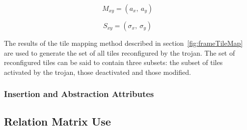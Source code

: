 \noindent\begin{minipage}{.5\linewidth}
	\begin{equation} \label{eqn:positionMedian}
	M_{xy} = (a_x,~a_y)
	\end{equation}
\end{minipage}%
\begin{minipage}{.5\linewidth}
	\begin{equation} \label{eqn:scatterScore}
	S_{xy} = (\sigma_x,~\sigma_y)
	\end{equation}
\end{minipage}
\newline

The results of the tile mapping method described in section~\ref{fig:frameTileMap} are used to generate the set of all tiles reconfigured by the trojan.
The set of reconfigured tiles can be said to contain three subsets: the subset of tiles activated by the trojan, those deactivated and those modified. 

\subsubsection{Insertion and Abstraction Attributes}
\subsection{Relation Matrix Use}

